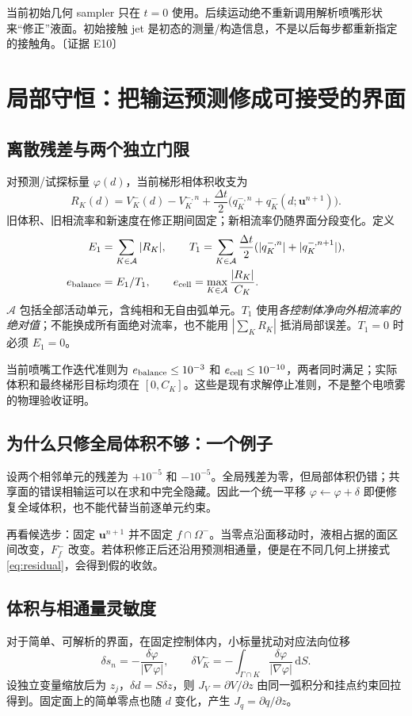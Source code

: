 \documentclass[UTF8,a4paper,11pt,fontset=fandol]{ctexart}
\newcommand{\ev}[1]{{\small\color{muted}〔证据 #1〕}}
\newcommand{\dd}{\,\mathrm d}
\newcommand{\uu}{\bm u}\newcommand{\nn}{\bm n}\newcommand{\xx}{\bm x}
\newcommand{\ph}{\varphi}\newcommand{\dt}{\Delta t}
\begin{document}
当前初始几何 sampler 只在 $t=0$ 使用。后续运动绝不重新调用解析喷嘴形状来“修正”液面。初始接触 jet 是初态的测量/构造信息，不是以后每步都重新指定的接触角。\ev{E10}

\section{局部守恒：把输运预测修成可接受的界面}
\subsection{离散残差与两个独立门限}
对预测/试探标量 $\ph(d)$，当前梯形相体积收支为
\begin{equation}
 R_K(d)=V_K^-(d)-V_K^{-,n}
       +\frac{\dt}{2}\big(q_K^{-,n}+q_K^-(d;\uu^{n+1})\big).
 \label{eq:residual}
\end{equation}
旧体积、旧相流率和新速度在修正期间固定；新相流率仍随界面分段变化。定义
\begin{align}
 E_1&=\sum_{K\in\mathcal A}|R_K|,\qquad
 T_1=\sum_{K\in\mathcal A}\frac{\dt}{2}(|q_K^{-,n}|+|q_K^{-,n+1}|),\\
 e_{\rm balance}&=E_1/T_1,\qquad
 e_{\rm cell}=\max_{K\in\mathcal A}\frac{|R_K|}{C_K}.
 \label{eq:gates}
\end{align}
$\mathcal A$ 包括全部活动单元，含纯相和无自由弧单元。$T_1$ 使用\emph{各控制体净向外相流率的绝对值}；不能换成所有面绝对流率，也不能用 $|\sum_KR_K|$ 抵消局部误差。$T_1=0$ 时必须 $E_1=0$。

当前喷嘴工作迭代准则为 $e_{\rm balance}\le10^{-3}$ 和 $e_{\rm cell}\le10^{-10}$，两者同时满足；实际体积和最终梯形目标均须在 $[0,C_K]$。这些是现有求解停止准则，不是整个电喷雾的物理验收证明。

\subsection{为什么只修全局体积不够：一个例子}
设两个相邻单元的残差为 $+10^{-5}$ 和 $-10^{-5}$。全局残差为零，但局部体积仍错；共享面的错误相输运可以在求和中完全隐藏。因此一个统一平移 $\ph\leftarrow\ph+\delta$ 即便修复全域体积，也不能代替当前逐单元约束。

再看候选步：固定 $\uu^{n+1}$ 并不固定 $f\cap\Omega^-$。当零点沿面移动时，液相占据的面区间改变，$F_f^-$ 改变。若体积修正后还沿用预测相通量，便是在不同几何上拼接式\eqref{eq:residual}，会得到假的收敛。

\subsection{体积与相通量灵敏度}
对于简单、可解析的界面，在固定控制体内，小标量扰动对应法向位移
\[
 \delta s_n=-\frac{\delta\ph}{|\nabla\ph|},\qquad
 \delta V_K^-=-\int_{\Gamma\cap K}\frac{\delta\ph}{|\nabla\ph|}\dd S.
\]
设独立变量缩放后为 $z_j$，$\delta d=S\delta z$，则 $J_V=\partial V/\partial z$ 由同一弧积分和挂点约束回拉得到。固定面上的简单零点也随 $d$ 变化，产生 $J_q=\partial q/\partial z$。
\end{document}
